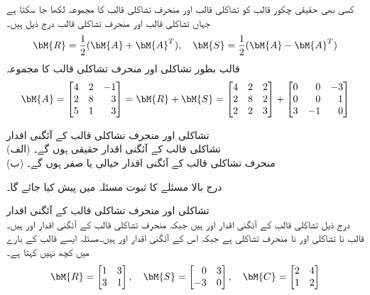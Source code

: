 کسی بھی حقیقی چکور قالب کو تشاکلی قالب  اور منحرف تشاکلی قالب  کا مجموعہ لکھا جا سکتا ہے جہاں تشاکلی قالب اور منحرف تشاکلی قالب درج ذیل ہیں۔
\begin{align}
\bM{R}=\frac{1}{2}(\bM{A}+\bM{A}^T),\quad \bM{S}=\frac{1}{2}(\bM{A}-\bM{A}^T)
\end{align}
\quad قالب بطور تشاکلی اور منحرف تشاکلی قالب کا مجموعہ\\
\begin{align*}
\bM{A}=\begin{bmatrix*}[r] 4&2&-1\\2&8&3\\5&1&3 \end{bmatrix*}=\bM{R}+\bM{S}=\begin{bmatrix*}[r]4&2&2\\2&8&2\\2&2&3  \end{bmatrix*}+\begin{bmatrix*}[r] 0&0&-3\\0&0&1\\3&-1&0  \end{bmatrix*}
\end{align*}

\quad تشاکلی اور منحرف تشاکلی قالب کے آئگنی اقدار\\
(الف) تشاکلی قالب کے آئگنی اقدار حقیقی ہوں گے۔\\
(ب) منحرف تشاکلی قالب کے آئگنی اقدار خیالی یا صفر ہوں گے۔ 

درج بالا مسئلے کا ثبوت مسئلہ  میں پیش کیا جائے گا۔

\quad تشاکلی اور منحرف تشاکلی قالب کے آئگنی اقدار\\
درج ذیل تشاکلی قالب  کے آئگنی اقدار  اور  ہیں جبکہ منحرف تشاکلی قالب  کے آئگنی اقدار  اور  ہیں۔قالب  نا تشاکلی اور نا منحرف تشاکلی ہے جبکہ اس کے آئگنی اقدار  اور  ہیں۔مسئلہ  ایسے قالب کے بارے میں کچھ نہیں کہتا ہے۔
\begin{align*}
\bM{R}=\begin{bmatrix*}[r]1&3\\3&1  \end{bmatrix*}, \quad\bM{S}=\begin{bmatrix*}[r] 0&3\\-3&0\end{bmatrix*},\quad \bM{C}=\begin{bmatrix}2&4\\1&2  \end{bmatrix}
\end{align*}

